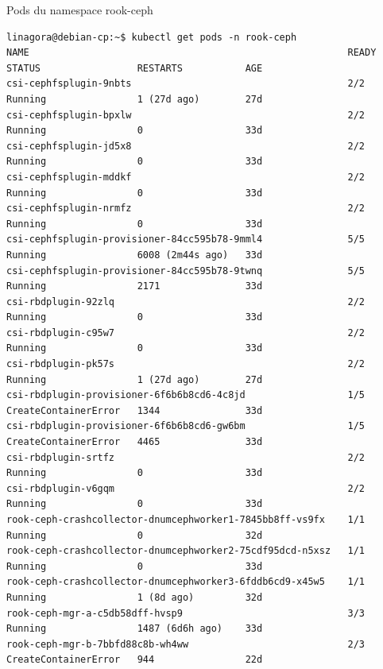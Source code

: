 \begin{frame}[fragile,shrink=0.9]{Pods du namespace rook-ceph}

\begin{tiny}
\begin{Verbatim}[commandchars=\\\{\}]
linagora@debian-cp:~$ kubectl get pods -n rook-ceph
NAME                                                        READY   STATUS                 RESTARTS           AGE
csi-cephfsplugin-9nbts                                      2/2     Running                1 (27d ago)        27d
csi-cephfsplugin-bpxlw                                      2/2     Running                0                  33d
csi-cephfsplugin-jd5x8                                      2/2     Running                0                  33d
csi-cephfsplugin-mddkf                                      2/2     Running                0                  33d
csi-cephfsplugin-nrmfz                                      2/2     Running                0                  33d
csi-cephfsplugin-provisioner-84cc595b78-9mml4               5/5     Running                6008 (2m44s ago)   33d
csi-cephfsplugin-provisioner-84cc595b78-9twnq               5/5     Running                2171               33d
csi-rbdplugin-92zlq                                         2/2     Running                0                  33d
csi-rbdplugin-c95w7                                         2/2     Running                0                  33d
csi-rbdplugin-pk57s                                         2/2     Running                1 (27d ago)        27d
csi-rbdplugin-provisioner-6f6b6b8cd6-4c8jd                  1/5     CreateContainerError   1344               33d
csi-rbdplugin-provisioner-6f6b6b8cd6-gw6bm                  1/5     CreateContainerError   4465               33d
csi-rbdplugin-srtfz                                         2/2     Running                0                  33d
csi-rbdplugin-v6gqm                                         2/2     Running                0                  33d
rook-ceph-crashcollector-dnumcephworker1-7845bb8ff-vs9fx    1/1     Running                0                  32d
rook-ceph-crashcollector-dnumcephworker2-75cdf95dcd-n5xsz   1/1     Running                0                  33d
rook-ceph-crashcollector-dnumcephworker3-6fddb6cd9-x45w5    1/1     Running                1 (8d ago)         32d
rook-ceph-mgr-a-c5db58dff-hvsp9                             3/3     Running                1487 (6d6h ago)    33d
rook-ceph-mgr-b-7bbfd88c8b-wh4ww                            2/3     CreateContainerError   944                22d

\end{Verbatim}
\end{tiny}
\end{frame}

